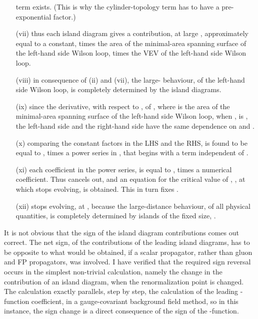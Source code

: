 \documentclass[a4paper,12pt,oneside]{article}
\begin{document}
\begin{itemize}
term exists.  (This is why the cylinder-topology term has to have a 
pre-exponential factor.)
\item[(vii)] thus each island diagram gives a contribution, at large \coordHE{},
approximately equal to a constant, times the area of the minimal-area
spanning surface of the left-hand side Wilson loop, times the VEV of the
left-hand side Wilson loop.
\item[(viii)] in consequence of (ii) and (vii), the large-\coordHE{} behaviour, of the
left-hand side Wilson loop, is completely determined by the island diagrams.
\item[(ix)] since the derivative, with respect to \coordHE{}, of \coordHE{},
where \coordHE{} is the area of the minimal-area spanning surface of the left-hand
side Wilson loop, when \coordHE{}, is \coordHE{}, the
left-hand side and the right-hand side have the same dependence on \coordHE{} and \coordHE{}.
\item[(x)] comparing the constant factors in the LHS and the RHS, \myHighlight{$\sigma$}\coordHE{} is found to
be equal to \coordHE{}, times a power series in \coordHE{}, that begins with
a term independent of \coordHE{}.
\item[(xi)] each coefficient in the power series, is equal to \myHighlight{$\sigma$}\coordHE{}, times a
numerical coefficient.  Thus \myHighlight{$\sigma$}\coordHE{} cancels out, and an equation for the
critical value of \coordHE{}, \coordHE{}, at which \coordHE{} stops
evolving, is obtained.  This in turn fixes \coordHE{}.
\item[(xii)] \coordHE{} stops evolving, at \coordHE{}, because the
large-distance behaviour, of all physical quantities, is completely
determined by islands of the fixed size, \coordHE{}.
\end{itemize}

It is not obvious that the sign of the island diagram contributions comes
out correct.  The net sign, of the contributions of the leading island
diagrams, has to be opposite to what would be obtained, if a scalar
propagator, rather than gluon and FP propagators, was involved.  I have
verified that the required sign reversal occurs in the simplest non-trivial
calculation, namely the change in the contribution of an island diagram,
when the renormalization point is changed.  The calculation exactly
parallels, step by step, the calculation of the leading \myHighlight{$\beta$}\coordHE{}-function
coefficient, in a gauge-covariant background field method, so in this
instance, the sign change is a direct consequence of the sign of the \myHighlight{$\beta$}\coordHE{}-function.
\end{document}
